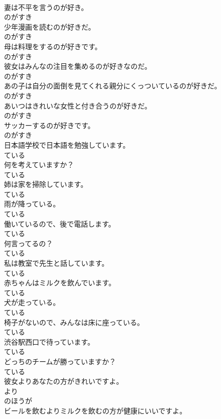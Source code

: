 \documentclass[8pt]{extreport}
\begin{document}
\begin{CJK}{UTF8}{min}
\\	妻は不平を言うのが好き。	
\\	のがすき
\\	少年漫画を読むのが好きだ。	
\\	のがすき
\\	母は料理をするのが好きです。	
\\	のがすき
\\	彼女はみんなの注目を集めるのが好きなのだ。	
\\	のがすき
\\	あの子は自分の面倒を見てくれる親分にくっついているのが好きだ。	
\\	のがすき
\\	あいつはきれいな女性と付き合うのが好きだ。	
\\	のがすき
\\	サッカーするのが好きです。	
\\	のがすき
\\	日本語学校で日本語を勉強しています。	
\\	ている
\\	何を考えていますか？	
\\	ている
\\	姉は家を掃除しています。	
\\	ている
\\	雨が降っている。	
\\	ている
\\	働いているので、後で電話します。	
\\	ている
\\	何言ってるの？	
\\	ている
\\	私は教室で先生と話しています。	
\\	ている
\\	赤ちゃんはミルクを飲んでいます。	
\\	ている
\\	犬が走っている。	
\\	ている
\\	椅子がないので、みんなは床に座っている。	
\\	ている
\\	渋谷駅西口で待っています。	
\\	ている
\\	どっちのチームが勝っていますか？	
\\	ている
\\	彼女よりあなたの方がきれいですよ。	
\\	より 
\\	のほうが 
\\	ビールを飲むよりミルクを飲むの方が健康にいいですよ。	

\end{CJK}
\end{document}
